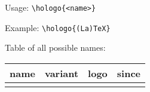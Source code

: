 \documentclass{article}
\begin{document}
Usage: \verb=\hologo{<name>}=

Example: \verb=\hologo{(La)TeX}= 

Table of all possible names:

\def\hologoEntry#1#2#3{%
	#1&#2&\hologoLogoSetup{#1}{variant=#2}\hologo{#1}&#3\tabularnewline
}
\begin{longtable}{>{\ttfamily}l>{\ttfamily}lll}
	\rmfamily\bfseries{name} & \rmfamily\bfseries variant
	& \bfseries logo & \bfseries since\\
	\hline
	\endhead
	\hologoList
\end{longtable}
\end{document}
